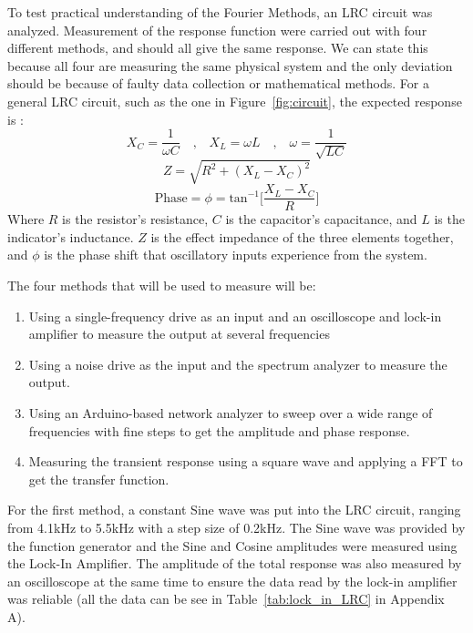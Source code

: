 \documentclass[12pt]{article}
\begin{document}
To test practical understanding of the Fourier Methods, an LRC circuit was analyzed. Measurement of the response function were carried out with four different methods, and should all give the same response. We can state this because all four are measuring the same physical system and the only deviation should be because of faulty data collection or mathematical methods. For a general LRC circuit, such as the one in Figure~\ref{fig:circuit}, the expected response is \cite{hyper}:
\begin{equation*}
    X_C = \frac{1}{\omega C}\quad \text{,} \quad X_L = \omega L \quad \text{,} \quad \omega = \frac{1}{\sqrt{LC}}
\end{equation*}
\begin{equation*}
    Z = \sqrt{R^2 + (X_L - X_C)^2}
\end{equation*}
\begin{equation}
    \text{Phase} = \phi = \text{tan}^{-1}\Big[\frac{X_L-X_C}{R}\Big]
    \label{eq:LRC}
\end{equation}
Where $R$ is the resistor's resistance, $C$ is the capacitor's capacitance, and $L$ is the indicator's inductance. $Z$ is the effect impedance of the three elements together, and $\phi$ is the phase shift that oscillatory inputs experience from the system. 
    
The four methods that will be used to measure will be: 
\begin{enumerate}
    \item Using a single-frequency drive as an input and an oscilloscope and lock-in amplifier to measure the output at several frequencies
    \item Using a noise drive as the input and the spectrum analyzer to measure the output.
    \item Using an Arduino-based network analyzer to sweep over a wide range of frequencies with fine steps to get the amplitude and phase response.
    \item Measuring the transient response using a square wave and applying a FFT to get the transfer function.
\end{enumerate}
    
For the first method, a constant Sine wave was put into the LRC circuit, ranging from 4.1kHz to 5.5kHz with a step size of 0.2kHz. The Sine wave was provided by the function generator and the Sine and Cosine amplitudes were measured using the Lock-In Amplifier. The amplitude of the total response was also measured by an oscilloscope at the same time to ensure the data read by the lock-in amplifier was reliable (all the data can be see in Table~\ref{tab:lock_in_LRC} in Appendix A). 
    
\end{document}
